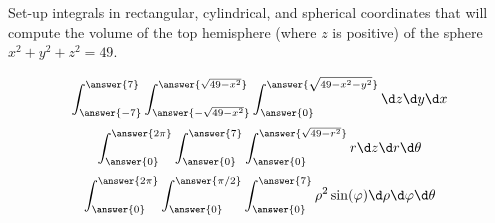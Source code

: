 \documentclass{ximera}
\author{Bart Snapp}
\begin{document}
\begin{exercise}
  Set-up integrals in rectangular, cylindrical, and spherical coordinates that
  will compute the volume of the top hemisphere (where $z$ is positive) of the sphere $x^2+y^2+z^2 = 49$.
  \begin{prompt}
  \[
  \int_{\answer{-7}}^{\answer{7}}\int_{\answer{-\sqrt{49-x^2}}}^{\answer{\sqrt{49-x^2}}}\int_{\answer{0}}^{\answer{\sqrt{49-x^2-y^2}}}\d z \d y \d x
  \]
  \[
  \int_{\answer{0}}^{\answer{2\pi}}\int_{\answer{0}}^{\answer{7}}\int_{\answer{0}}^{\answer{\sqrt{49-r^2}}}   r\d z \d r \d \theta
  \]
  \[
  \int_{\answer{0}}^{\answer{2\pi}}\int_{\answer{0}}^{\answer{\pi/2}}\int_{\answer{0}}^{\answer{7}}   \rho^2\sin(\varphi)\d \rho \d \varphi \d \theta
  \]
  \end{prompt}
\end{exercise}
\end{document}

